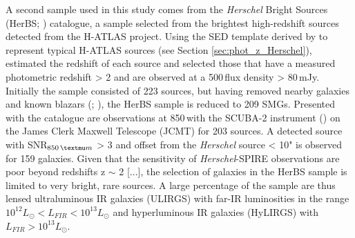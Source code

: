 A second sample used in this study comes from the \textit{Herschel} Bright Sources (HerBS; \citealt{Bakx_2018}) catalogue, a sample selected from the brightest high-redshift sources detected from the H-ATLAS project. Using the SED template derived by \citealt{Pearson_2013} to represent typical H-ATLAS sources (see Section \ref{sec:phot_z_Herschel}), \citealt{Bakx_2018} estimated the redshift of each source and selected those that have a measured photometric redshift > 2 and are observed at a 500\,\micron flux density > 80\,mJy. Initially the sample consisted of 223 sources, but having removed nearby galaxies and known blazars (\citealt{Negrello_2010}; \citealt{Lopez-Caniego_2013}), the HerBS sample is reduced to 209 SMGs. Presented with the catalogue are observations at 850\,\micron with the SCUBA-2 instrument (\citealt{Holland_2013}) on the James Clerk Maxwell Telescope (JCMT) for 203 sources. A detected source with SNR$_{850\,\micron}$ > 3 and offset from the \textit{Herschel} source < 10" is observed for 159 galaxies. Given that the sensitivity of \textit{Herschel}-SPIRE observations are poor beyond redshifts z $\sim$ 2 [...], the selection of galaxies in the HerBS sample is limited to very bright, rare sources. A large percentage of the sample are thus lensed ultraluminous IR galaxies (ULIRGS) with far-IR luminosities in the range $10^{12} L_\odot < L_{FIR} < 10^{13} L_\odot$ and hyperluminous IR galaxies (HyLIRGS) with $L_{FIR} > 10^{13} L_\odot$.

